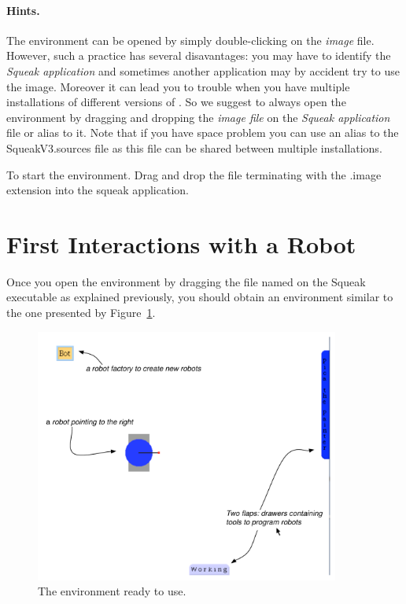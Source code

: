 \paragraph{Hints.}
The environment can be opened by simply double-clicking on the \textit{image} file. However, such a practice has several disavantages: you may have to identify the \emph{Squeak application} and sometimes another application may by accident try to use the image. Moreover it can lead you to trouble when you have multiple installations of different versions of \sq. So we suggest to always open the environment by dragging and dropping the \emph{image file} on the \emph{Squeak application} file or alias to it. Note that if you have space problem you can use an alias to the SqueakV3.sources file as this file can be shared between multiple installations. 

\begin{largecadre}{To start the environment. 
Drag and drop the file terminating with the .image extension into the squeak application.}
\end{largecadre}
 
\section{First Interactions with a Robot}

Once you open the environment by dragging the file named  on the Squeak executable as explained previously, you should obtain an environment similar to the one presented by Figure~\ref{fig:firstEnvironment}. 


\begin{figure}[!h]\centerline{\includegraphics[width=10cm]{firstEnvironmentAnnotated}} 
\caption{The environment ready to use.\label{fig:firstEnvironment}}
\end{figure}

